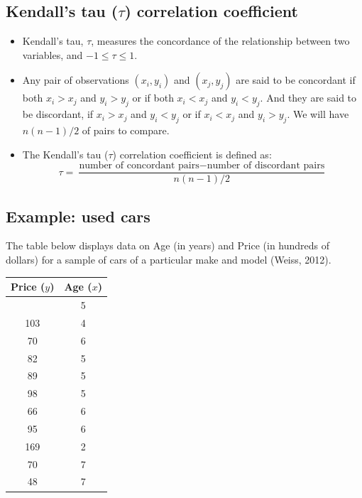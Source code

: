 \documentclass[
]{article}
\begin{document}
\hypertarget{kendalls-tau-tau-correlation-coefficient}{%
\subsection{\texorpdfstring{Kendall's tau (\(\tau\)) correlation
coefficient}{Kendall's tau (\textbackslash tau) correlation coefficient}}\label{kendalls-tau-tau-correlation-coefficient}}

\begin{itemize}
\item
  Kendall's tau, \(\tau\), measures the concordance of the relationship
  between two variables, and \(-1\leq \tau \leq 1\).
\item
  Any pair of observations \((x_i, y_i)\) and \((x_j, y_j)\) are said to
  be concordant if both \(x_i > x_j\) and \(y_i > y_j\) or if both
  \(x_i < x_j\) and \(y_i < y_j\). And they are said to be discordant,
  if \(x_i > x_j\) and \(y_i < y_j\) or if \(x_i < x_j\) and
  \(y_i > y_j\). We will have \(n(n-1)/2\) of pairs to compare.
\item
  The Kendall's tau (\(\tau\)) correlation coefficient is defined as:
  \[\tau=\frac{\text{number of concordant pairs} - \text{number of discordant pairs}}{n(n-1)/2}\]
\end{itemize}

\hypertarget{example-used-cars}{%
\subsection{Example: used cars}\label{example-used-cars}}

The table below displays data on Age (in years) and Price (in hundreds
of dollars) for a sample of cars of a particular make and model (Weiss,
2012).

\begin{longtable}[]{@{}cc@{}}
\toprule\noalign{}
Price (\(y\)) & Age (\(x\)) \\
\midrule\noalign{}
\endhead
\bottomrule\noalign{}
\endlastfoot
85 & 5 \\
103 & 4 \\
70 & 6 \\
82 & 5 \\
89 & 5 \\
98 & 5 \\
66 & 6 \\
95 & 6 \\
169 & 2 \\
70 & 7 \\
48 & 7 \\
\end{longtable}
\end{document}
